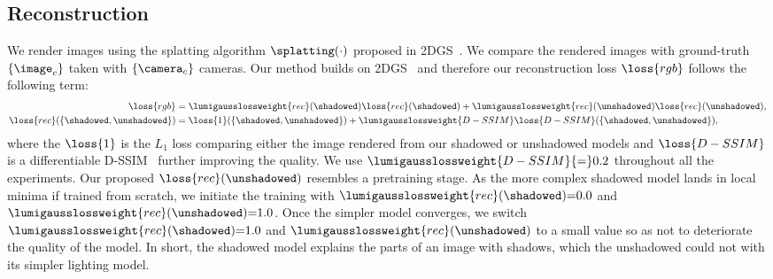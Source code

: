   \subsection{Reconstruction}
    \label{subsec:lumigauss-reconstruction}
    We render images using the splatting algorithm $\splatting(\cdot)$
    proposed in 2DGS~\cite{huang20242d}.
    We compare the rendered images with ground-truth $\{\image_c\}$ taken with
    $\{\camera_c\}$ cameras.
    Our method builds on 2DGS~\cite{huang20242d} and therefore our reconstruction loss $\loss{rgb}$ follows the following term:
    \begin{align}
      \loss{rgb}                             & = \lumigausslossweight{rec}(\shadowed)\loss{rec}(\shadowed) + \lumigausslossweight{rec}(\unshadowed)\loss{rec}(\unshadowed), \\
      \loss{rec}(\{\shadowed, \unshadowed\}) & = \loss{1}(\{\shadowed, \unshadowed\}) + \lumigausslossweight{D-SSIM}\loss{D-SSIM}(\{\shadowed, \unshadowed\}),
    \end{align}
    where the $\loss{1}$ is the $L_1$ loss comparing either the image rendered from our shadowed or unshadowed models and $\loss{D-SSIM}$ is a differentiable D-SSIM~\cite{ssim} further improving the quality.
    We use $\lumigausslossweight{D-SSIM}{=}0.2$ throughout all the
    experiments.
    Our proposed $\loss{rec}(\unshadowed)$ resembles a pretraining stage.
    As the more complex shadowed model lands in local minima if trained from
    scratch, we initiate the training with
    $\lumigausslossweight{rec}(\shadowed){=}0.0$ and
    $\lumigausslossweight{rec}(\unshadowed){=}1.0$.
    Once the simpler model converges, we switch
    $\lumigausslossweight{rec}(\shadowed){=}1.0$ and
    $\lumigausslossweight{rec}(\unshadowed)$ to a small value so as not to
    deteriorate the quality of the model.
    In short, the shadowed model explains the parts of an image with shadows,
    which the unshadowed could not with its simpler lighting model.





